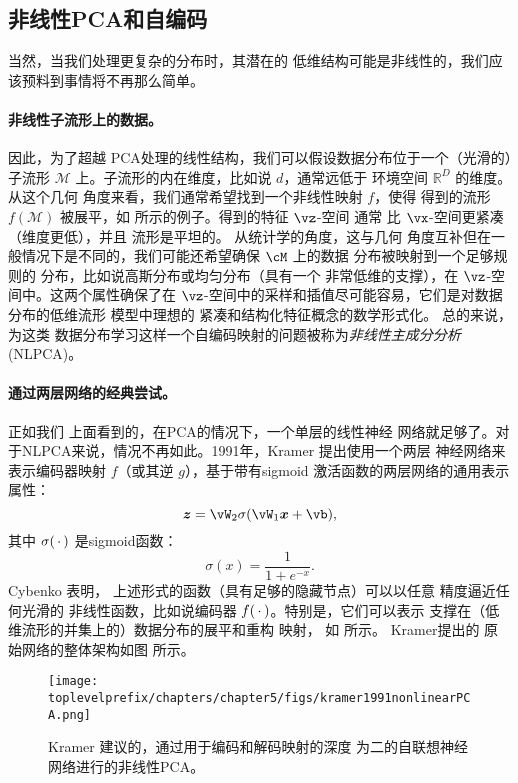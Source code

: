 \documentclass[../../book-main.tex]{subfiles}
\begin{document}
\subsection{非线性PCA和自编码}\label{sub:nonlinear-pca}\label{sec:NLPCA}
当然，当我们处理更复杂的分布时，其潜在的
低维结构可能是非线性的，我们应该预料到事情将不再那么简单。

\paragraph{非线性子流形上的数据。} 因此，为了超越
PCA处理的线性结构，我们可以假设数据分布位于一个（光滑的）子流形 $\mathcal{M}$ 上。子流形的内在维度，比如说 $d$，通常远低于
环境空间 $\mathbb{R}^D$ 的维度。从这个几何
角度来看，我们通常希望找到一个非线性映射 $f$，使得
得到的流形
$f(\mathcal{M})$ 被展平，如  所示的例子。得到的特征 $\vz$-空间
通常
比 $\vx$-空间更紧凑（维度更低），并且
流形是平坦的。
从统计学的角度，这与几何
角度互补但在一般情况下是不同的，我们可能还希望确保 $\cM$ 上的数据
分布被映射到一个足够规则的
分布，比如说高斯分布或均匀分布（具有一个
非常低维的支撑），在 $\vz$-空间中。这两个属性确保了在 $\vz$-空间中的采样和插值尽可能容易，它们是对数据分布的低维流形
模型中理想的
紧凑和结构化特征概念的数学形式化。
总的来说，为这类
数据分布学习这样一个自编码映射的问题被称为{\em 非线性主成分分析}
(NLPCA)。

\paragraph{通过两层网络的经典尝试。} 正如我们
上面看到的，在PCA的情况下，一个单层的线性神经
网络就足够了。对于NLPCA来说，情况不再如此。1991年，Kramer
\cite{Kramer1991NonlinearPC} 提出使用一个两层
神经网络来表示编码器映射 $f$（或其逆 $g$），基于带有sigmoid
激活函数的两层网络的通用表示属性：
\begin{equation}
  \z = \vW_2 \sigma(\vW_1\x +\vb),
\end{equation}
其中 $\sigma(\,\cdot\,)$ 是sigmoid函数：
\begin{equation}
  \sigma(x) = \frac{1}{1+ e^{-x}}.
\end{equation}
Cybenko \cite{Cybenko1989ApproximationBS} 表明，
上述形式的函数（具有足够的隐藏节点）可以以任意
精度逼近任何光滑的
非线性函数，比如说编码器 $f(\,\cdot\,)$。特别是，它们可以表示
支撑在（低维流形的并集上的）数据分布的展平和重构
映射，
如  所示。
Kramer提出的
原始网络的整体架构如图  所示。
\begin{figure}[tb]
  \centering
  \texttt{[image: \\toplevelprefix/chapters/chapter5/figs/kramer1991nonlinearPCA.png]}
  \caption{Kramer \cite{Kramer1991NonlinearPC} 建议的，通过用于编码和解码映射的深度
    为二的自联想神经网络进行的非线性PCA。}
  \label{fig:NLPCA}
\end{figure}
\end{document}
